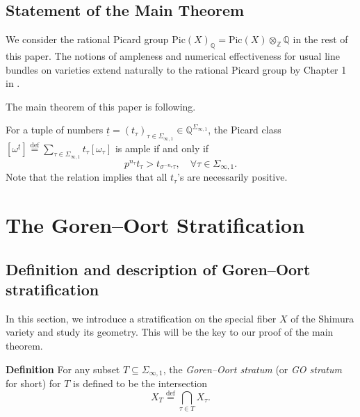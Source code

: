 \documentclass{article}
\begin{document}
\subsection{Statement of the Main Theorem}

We consider the rational Picard group Pic$(X)_\mathbb{Q}=$Pic$(X)\otimes_\mathbb{Z}\mathbb{Q}$ in the rest of this paper. The notions of ampleness and numerical effectiveness for usual line bundles on varieties extend naturally to the rational Picard group by Chapter 1 in \citep{Lazarsfeld}.

The main theorem of this paper is following.

\begin{theorem}\label{main}
For a tuple of numbers $\underline{t}=(t_\tau)_{\tau\in\Sigma_{\infty,1}}\in \mathbb{Q}^{\Sigma_{\infty,1}}$, the Picard class $[\omega^{\underline{t}}]\stackrel{\text{def}}{=}\sum\limits_{\tau\in\Sigma_{\infty,1}}t_\tau[\omega_\tau]$ is ample if and only if
	\begin{equation}\label{inequality}
		p^{n_\tau}t_\tau>t_{\sigma^{-n_\tau}\tau},\quad \forall\tau\in \Sigma_{\infty,1}.
	\end{equation}
Note that the relation implies that all $t_\tau$'s are necessarily positive.
\end{theorem}









\section{The Goren--Oort Stratification}\label{Stratification}

\subsection{Definition and description of Goren--Oort stratification}

In this section, we introduce a stratification on the special fiber $X$ of the Shimura variety and study its geometry. This will be the key to our proof of the main theorem.

\medskip

\noindent\textbf{Definition}
For any subset $T\subseteq\Sigma_{\infty,1}$, the \emph{Goren--Oort stratum} (or \emph{GO stratum} for short) for $T$ is defined to be the intersection
	\begin{equation}
		X_T\overset{\text{def}}{=}\bigcap_{\tau\in T}X_\tau.
	\end{equation}
\end{document}
